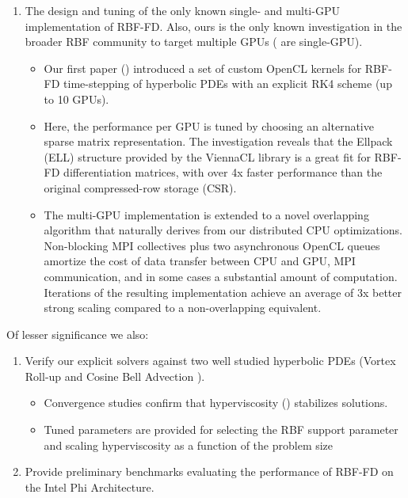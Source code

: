 \begin{enumerate}
\begin{itemize}
\end{itemize} 
\item The design and tuning of the only known single- and multi-GPU implementation of RBF-FD. Also, ours is the only known investigation in the broader RBF community to target multiple GPUs (\cite{Schmidt2009a,Cuomo2013} are single-GPU). 
\begin{itemize} 
\item Our first paper (\cite{BolligFlyerErlebacher2012}) introduced a set of custom OpenCL kernels for RBF-FD time-stepping of hyperbolic PDEs with an explicit RK4 scheme (up to 10 GPUs). 
\item Here, the performance per GPU is tuned by choosing an alternative sparse matrix representation. The investigation reveals that the Ellpack (ELL) structure provided by the ViennaCL library \cite{Rupp2010} is a great fit for RBF-FD differentiation matrices, with over 4x faster performance than the original compressed-row storage (CSR). %
\item The multi-GPU implementation is extended to a novel overlapping algorithm that naturally derives from our distributed CPU optimizations. Non-blocking MPI collectives plus two asynchronous OpenCL queues amortize the cost of data transfer between CPU and GPU, MPI communication, and in some cases a substantial amount of computation. Iterations of the resulting implementation achieve an average of 3x better strong scaling compared to a non-overlapping equivalent. 
\end{itemize} 
\end{enumerate}
Of lesser significance we also: 
\begin{enumerate}
\item Verify our explicit solvers against two well studied hyperbolic PDEs (Vortex Roll-up \cite{NairTransport05, NairJablonowski08} and Cosine Bell Advection \cite{JakobChien1995}).
\begin{itemize} 
\item Convergence studies confirm that hyperviscosity (\cite{Fornberg2011b}) stabilizes solutions.
\item Tuned parameters are provided for selecting the RBF support parameter and scaling hyperviscosity as a function of the problem size
\end{itemize}
\item Provide preliminary benchmarks evaluating the performance of RBF-FD on the Intel Phi Architecture. 
\end{enumerate}


